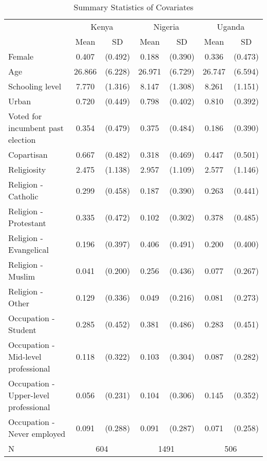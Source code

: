 \begin{table}[htb]
\centering
\caption{Summary Statistics of Covariates} 
\label{tab:summary_covs}
\begin{tabular}{lcccccc}
  \hline
  \hline
 & \multicolumn{2}{c}{Kenya}& \multicolumn{2}{c}{Nigeria}& \multicolumn{2}{c}{Uganda} \\ & Mean & SD & Mean & SD & Mean & SD \\ \hline
  Female & 0.407 & (0.492) & 0.188 & (0.390) & 0.336 & (0.473) \\ 
  Age & 26.866 & (6.228) & 26.971 & (6.729) & 26.747 & (6.594) \\ 
  Schooling level & 7.770 & (1.316) & 8.147 & (1.308) & 8.261 & (1.151) \\ 
  Urban & 0.720 & (0.449) & 0.798 & (0.402) & 0.810 & (0.392) \\ 
  Voted for incumbent past election & 0.354 & (0.479) & 0.375 & (0.484) & 0.186 & (0.390) \\ 
  Copartisan & 0.667 & (0.482) & 0.318 & (0.469) & 0.447 & (0.501) \\ 
  Religiosity & 2.475 & (1.138) & 2.957 & (1.109) & 2.577 & (1.146) \\ 
  Religion - Catholic & 0.299 & (0.458) & 0.187 & (0.390) & 0.263 & (0.441) \\ 
  Religion - Protestant & 0.335 & (0.472) & 0.102 & (0.302) & 0.378 & (0.485) \\ 
  Religion - Evangelical & 0.196 & (0.397) & 0.406 & (0.491) & 0.200 & (0.400) \\ 
  Religion - Muslim & 0.041 & (0.200) & 0.256 & (0.436) & 0.077 & (0.267) \\ 
  Religion - Other & 0.129 & (0.336) & 0.049 & (0.216) & 0.081 & (0.273) \\ 
  Occupation - Student & 0.285 & (0.452) & 0.381 & (0.486) & 0.283 & (0.451) \\ 
  Occupation - Mid-level professional & 0.118 & (0.322) & 0.103 & (0.304) & 0.087 & (0.282) \\ 
  Occupation - Upper-level professional & 0.056 & (0.231) & 0.104 & (0.306) & 0.145 & (0.352) \\ 
  Occupation - Never employed & 0.091 & (0.288) & 0.091 & (0.287) & 0.071 & (0.258) \\ 
N & \multicolumn{2}{c}{604} & \multicolumn{2}{c}{1491}& \multicolumn{2}{c}{506} \\ \hline
   \hline
\end{tabular}

\end{table}

